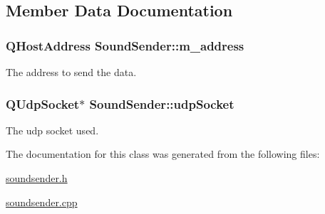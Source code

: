 \subsection{\-Member \-Data \-Documentation}
\hypertarget{class_sound_sender_aa2046b227bcc7cf1be86aabd197aaa3f}{
\subsubsection[{m\-\_\-address}]{\setlength{\rightskip}{0pt plus 5cm}\-Q\-Host\-Address {\bf \-Sound\-Sender\-::m\-\_\-address}}}
\label{class_sound_sender_aa2046b227bcc7cf1be86aabd197aaa3f}


\-The address to send the data. 

\hypertarget{class_sound_sender_a00386335e797a20af7a64a77871553ae}{
\subsubsection[{udp\-Socket}]{\setlength{\rightskip}{0pt plus 5cm}\-Q\-Udp\-Socket$\ast$ {\bf \-Sound\-Sender\-::udp\-Socket}}}
\label{class_sound_sender_a00386335e797a20af7a64a77871553ae}


\-The udp socket used. 



\-The documentation for this class was generated from the following files\-:\begin{DoxyCompactItemize}
\item 
\hyperlink{soundsender_8h}{soundsender.\-h}\item 
\hyperlink{soundsender_8cpp}{soundsender.\-cpp}\end{DoxyCompactItemize}
